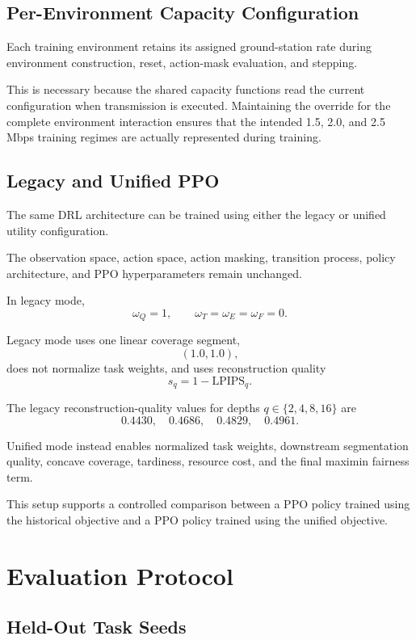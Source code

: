 \documentclass[11pt]{article}
\begin{document}
\subsection{Per-Environment Capacity Configuration}

Each training environment retains its assigned ground-station rate during
environment construction, reset, action-mask evaluation, and stepping.

This is necessary because the shared capacity functions read the current
configuration when transmission is executed. Maintaining the override for
the complete environment interaction ensures that the intended
1.5, 2.0, and 2.5 Mbps training regimes are actually represented during
training.


\subsection{Legacy and Unified PPO}

The same DRL architecture can be trained using either the legacy or unified
utility configuration.

The observation space, action space, action masking, transition process,
policy architecture, and PPO hyperparameters remain unchanged.

In legacy mode,
\[
\omega_Q=1,
\qquad
\omega_T=\omega_E=\omega_F=0.
\]

Legacy mode uses one linear coverage segment,
\[
(1.0,1.0),
\]
does not normalize task weights, and uses reconstruction quality
\[
s_q=1-\mathrm{LPIPS}_q.
\]

The legacy reconstruction-quality values for depths
$q\in\{2,4,8,16\}$ are
\[
0.4430,\quad
0.4686,\quad
0.4829,\quad
0.4961.
\]

Unified mode instead enables normalized task weights, downstream segmentation
quality, concave coverage, tardiness, resource cost, and the final maximin
fairness term.

This setup supports a controlled comparison between a PPO policy trained
using the historical objective and a PPO policy trained using the unified
objective.


\section{Evaluation Protocol}

\subsection{Held-Out Task Seeds}
\end{document}
